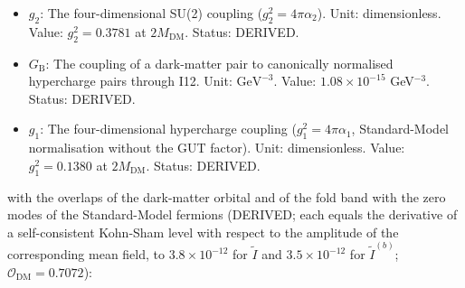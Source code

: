 \documentclass[
  10pt,
]{article}
\begin{document}
\begin{itemize}
  \(G_{\mathrm{W}}\): The coupling of a dark-matter pair to canonically
  normalised SU(2) gauge pairs through I12. Unit: \(\mathrm{GeV}^{-3}\).
  Value: \(2.96\times10^{-15}\) GeV\(^{-3}\). Status: DERIVED.
\item
  \(g_2\): The four-dimensional SU(2) coupling
  (\(g_2^2 = 4\pi\alpha_2\)). Unit: dimensionless. Value:
  \(g_2^2 = 0.3781\) at \(2M_{\mathrm{DM}}\). Status: DERIVED.
\item
  \(G_{\mathrm{B}}\): The coupling of a dark-matter pair to canonically
  normalised hypercharge pairs through I12. Unit: \(\mathrm{GeV}^{-3}\).
  Value: \(1.08\times10^{-15}\) GeV\(^{-3}\). Status: DERIVED.
\item
  \(g_1\): The four-dimensional hypercharge coupling
  (\(g_1^2 = 4\pi\alpha_1\), Standard-Model normalisation without the
  GUT factor). Unit: dimensionless. Value: \(g_1^2 = 0.1380\) at
  \(2M_{\mathrm{DM}}\). Status: DERIVED.
\end{itemize}

with the overlaps of the dark-matter orbital and of the fold band with
the zero modes of the Standard-Model fermions (DERIVED; each equals the
derivative of a self-consistent Kohn-Sham level with respect to the
amplitude of the corresponding mean field, to \(3.8\times10^{-12}\) for
\(\tilde I\) and \(3.5\times10^{-12}\) for \(\tilde I^{(b)}\);
\(\mathcal{O}_{\mathrm{DM}} = 0.7072\)):
\end{document}
